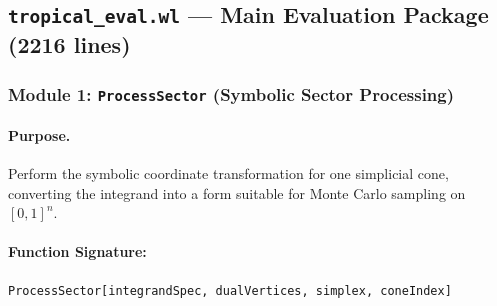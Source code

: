 \documentclass[11pt,a4paper]{article}
\begin{document}
\subsection{\texttt{tropical\_eval.wl} --- Main Evaluation Package (2216 lines)}

\subsubsection{Module 1: \texttt{ProcessSector} (Symbolic Sector Processing)}

\paragraph{Purpose.} Perform the symbolic coordinate transformation for one simplicial cone, converting the integrand into a form suitable for Monte Carlo sampling on $[0,1]^n$.

\paragraph{Function Signature:}
\begin{lstlisting}
ProcessSector[integrandSpec, dualVertices, simplex, coneIndex]
\end{lstlisting}
\end{document}
